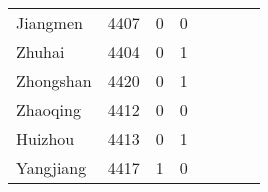\documentclass[12pt]{article}
\begin{document}
\begin{table}[!htb]
\begin{adjustbox}{width=\textwidth, totalheight=\baselineskip,keepaspectratio}
\begin{tabular}{llrlllrl}
  Jiangmen &  4407 &    0 &   0 &              &      &     &    \\
    Zhuhai &  4404 &    0 &   1 &              &      &     &    \\
 Zhongshan &  4420 &    0 &   1 &              &      &     &    \\
  Zhaoqing &  4412 &    0 &   0 &              &      &     &    \\
   Huizhou &  4413 &    0 &   1 &              &      &     &  \\
 Yangjiang &  4417 &    1 &   0 &              
\end{tabular}
\end{adjustbox}
\end{table}

%
%

\end{document}
